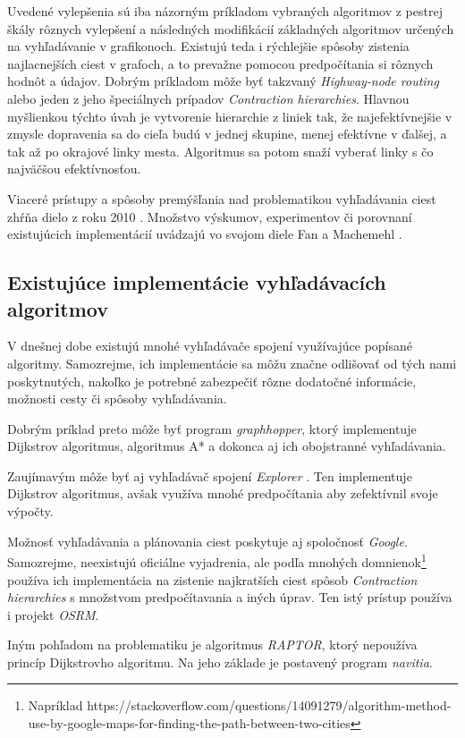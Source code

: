Uvedené vylepšenia sú iba názorným príkladom vybraných algoritmov z pestrej škály rôznych vylepšení a následných modifikácií základných algoritmov určených na vyhľadávanie v grafikonoch. Existujú teda i rýchlejšie spôsoby zistenia najlacnejších ciest v grafoch, a to prevažne pomocou predpočítania si rôznych hodnôt a údajov. Dobrým príkladom môže byť takzvaný \textit{Highway-node routing}\cite{schultes2007dynamic} alebo jeden z jeho špeciálnych prípadov \textendash \textit{Contraction hierarchies}\cite{geisberger2008contraction}. Hlavnou myšlienkou týchto úvah je vytvorenie hierarchie z liniek tak, že najefektívnejšie v zmysle dopravenia sa do cieľa budú v jednej skupine, menej efektívne v ďalšej, a tak až po okrajové linky mesta. Algoritmus sa potom snaží vyberať linky s čo najväčšou efektívnosťou.\newline

Viaceré prístupy a spôsoby premýšľania nad problematikou vyhľadávania ciest zhŕňa dielo z roku 2010 \cite{bast2010fast}. Množstvo výskumov, experimentov či porovnaní existujúcich implementácií uvádzajú vo svojom diele Fan a Machemehl \cite{fan2004optimal}.


\subsection{Existujúce implementácie vyhľadávacích algoritmov}

V dnešnej dobe existujú mnohé vyhľadávače spojení využívajúce popísané algoritmy. Samozrejme, ich implementácie sa môžu značne odlišovať od tých nami poskytnutých, nakoľko je potrebné zabezpečiť rôzne dodatočné informácie, možnosti cesty či spôsoby vyhľadávania.\newline

Dobrým príklad preto môže byť program \textit{graphhopper}\cite{graphhopper}, ktorý implementuje Dijkstrov algoritmus, algoritmus A* a dokonca aj ich obojstranné vyhľadávania.\newline

Zaujímavým môže byť aj vyhľadávač spojení \textit{Explorer} \cite{watkins2010explore}. Ten implementuje Dijkstrov algoritmus, avšak využíva mnohé predpočítania aby zefektívnil svoje výpočty.\newline

Možnosť vyhľadávania a plánovania ciest poskytuje aj spoločnosť \textit{Google}. Samozrejme, neexistujú oficiálne vyjadrenia, ale podľa mnohých domnienok\footnote{Napríklad https://stackoverflow.com/questions/14091279/algorithm-method-use-by-google-maps-for-finding-the-path-between-two-cities} používa ich implementácia na zistenie najkratších ciest spôsob \textit{Contraction hierarchies} s množstvom predpočítavania a iných úprav. Ten istý prístup používa i projekt \textit{OSRM}\cite{OSRM}.\newline

Iným pohľadom na problematiku je algoritmus \textit{RAPTOR}\cite{delling2014round}, ktorý nepoužíva princíp Dijkstrovho algoritmu. Na jeho základe je postavený program \textit{navitia}\cite{navitia}.\newline
